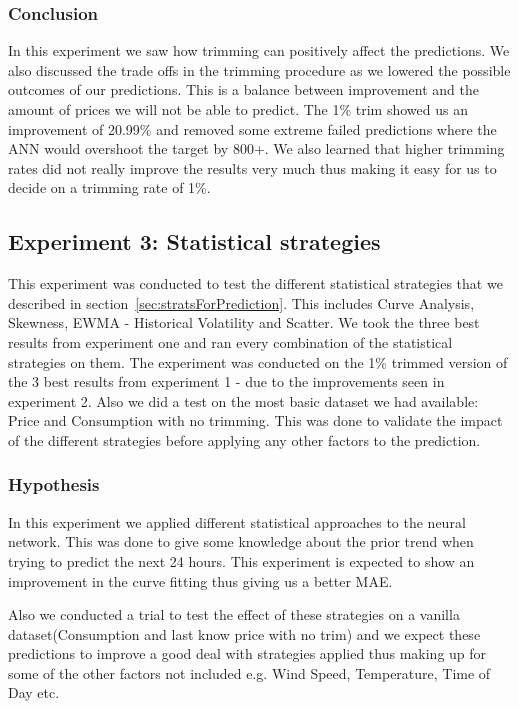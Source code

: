 \subsubsection{Conclusion}
In this experiment we saw how trimming can positively affect the predictions. We also discussed the trade offs in the trimming procedure as we lowered the possible outcomes of our predictions. This is a balance between improvement and the amount of prices we will not be able to predict. The 1\% trim showed us an improvement of 20.99\% and removed some extreme failed predictions where the ANN would overshoot the target by 800+. We also learned that higher trimming rates did not really improve the results very much thus making it easy for us to decide on a trimming rate of 1\%.

\newpage
\subsection{Experiment 3: Statistical strategies}
This experiment was conducted to test the different statistical strategies that we described in section~\ref{sec:stratsForPrediction}. This includes Curve Analysis, Skewness, EWMA - Historical Volatility and Scatter. We took the three best results from experiment one and ran every combination of the statistical strategies on them. The experiment was conducted on the 1\% trimmed version of the 3 best results from experiment 1 - due to the improvements seen in experiment 2. Also we did a test on the most basic dataset we had available: Price and Consumption with no trimming. This was done to validate the impact of the different strategies before applying any other factors to the prediction.

\subsubsection{Hypothesis}
In this experiment we applied different statistical approaches to the neural network. This was done to give some knowledge about the prior trend when trying to predict the next 24 hours. This experiment is expected to show an improvement in the curve fitting thus giving us a better MAE.

Also we conducted a trial to test the effect of these strategies on a vanilla dataset(Consumption and last know price with no trim) and we expect these predictions to improve a good deal with strategies applied thus making up for some of the other factors not included e.g. Wind Speed, Temperature, Time of Day etc.

